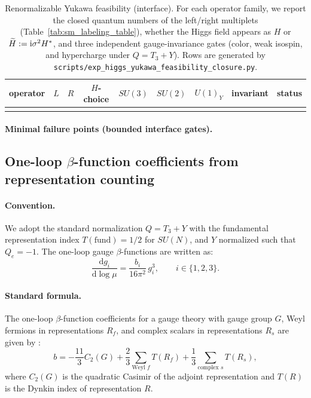 \begin{table}[t]
\centering
\small
\setlength{\tabcolsep}{6pt}
\renewcommand{\arraystretch}{1.08}
\begin{tabular}{lcccccccc}
\toprule
operator & $L$ & $R$ & $H$-choice & $SU(3)$ & $SU(2)$ & $U(1)_Y$ & invariant & status \\
\midrule
%
\\
\bottomrule
\end{tabular}
\caption{Renormalizable Yukawa feasibility (interface). For each operator family, we report the closed quantum numbers of the left/right multiplets (Table~\ref{tab:sm_labeling_table}), whether the Higgs field appears as $H$ or $\widetilde H:=\mathrm{i}\sigma^2 H^\ast$, and three independent gauge-invariance gates (color, weak isospin, and hypercharge under $Q=T_3+Y$). Rows are generated by \texttt{scripts/exp\_higgs\_yukawa\_feasibility\_closure.py}.}
\label{tab:higgs_yukawa_feasibility}
\end{table}

\paragraph{Minimal failure points (bounded interface gates).}
%

\subsection{One-loop \texorpdfstring{$\beta$}{beta}-function coefficients from representation counting}
\label{subsec:beta_from_representation}

\paragraph{Convention.}
\MatchTag We adopt the standard normalization $Q=T_3+Y$ with the fundamental representation index $T(\text{fund})=1/2$ for $SU(N)$, and $Y$ normalized such that $Q_e=-1$.
The one-loop gauge $\beta$-functions are written as:
\begin{equation}\label{eq:beta_convention}
\frac{\mathrm{d}g_i}{\mathrm{d}\log\mu} = \frac{b_i}{16\pi^2}\,g_i^3, \qquad i\in\{1,2,3\}.
\end{equation}

\paragraph{Standard formula.}
The one-loop $\beta$-function coefficients for a gauge theory with gauge group $G$, Weyl fermions in representations $R_f$, and complex scalars in representations $R_s$ are given by \cite{MachacekVaughn1983,MachacekVaughn1984}:
\begin{equation}\label{eq:beta_one_loop_general}
b = -\frac{11}{3}C_2(G) + \frac{2}{3}\sum_{\text{Weyl }f} T(R_f) + \frac{1}{3}\sum_{\text{complex }s} T(R_s),
\end{equation}
where $C_2(G)$ is the quadratic Casimir of the adjoint representation and $T(R)$ is the Dynkin index of representation $R$.

